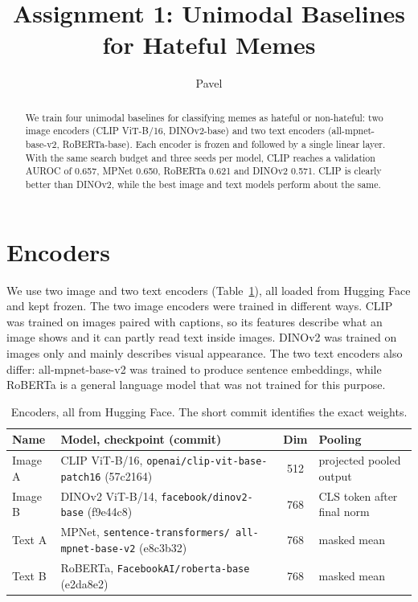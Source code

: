 \documentclass[compactaffiliation]{Interspeech}
\title{Assignment 1: Unimodal Baselines for Hateful Memes}
\author[affiliation={1}]{Pavel}{Adamov}
\affiliation{}{Johannes Kepler University Linz}{Austria}
\begin{document}
\maketitle
{}

\begin{abstract}
We train four unimodal baselines for classifying memes as hateful or non-hateful: two image
encoders (CLIP ViT-B/16, DINOv2-base) and two text encoders (all-mpnet-base-v2, RoBERTa-base). Each
encoder is frozen and followed by a single linear layer. With the same search budget and three
seeds per model, CLIP reaches a validation AUROC of 0.657, MPNet 0.650, RoBERTa 0.621 and DINOv2
0.571. CLIP is clearly better than DINOv2, while the best image and text models perform about the same.
\end{abstract}



\section{Encoders}
We use two image and two text encoders (Table~\ref{tab:encoders}), all loaded from Hugging Face and
kept frozen. The two image encoders were trained in different ways. CLIP \cite{radford2021clip}
was trained on images paired with captions, so its features describe what an image shows and it
can partly read text inside images. DINOv2 \cite{oquab2024dinov2} was trained on images only and
mainly describes visual appearance. The two text encoders also differ: all-mpnet-base-v2
\cite{reimers2019sbert, song2020mpnet} was trained to produce sentence embeddings, while RoBERTa
\cite{liu2019roberta} is a general language model that was not trained for this purpose.

\begin{table}[b]
\caption{Encoders, all from Hugging Face. The short commit identifies the exact weights.}
\label{tab:encoders}
\centering\scriptsize
\setlength{\tabcolsep}{2.5pt}
\begin{tabular}{@{}l >{\raggedright\arraybackslash}p{4.15cm} c >{\raggedright\arraybackslash}p{1.45cm}@{}}
\toprule
Name & Model, checkpoint (commit) & Dim & Pooling \\
\midrule
Image A & CLIP ViT-B/16, \texttt{openai/clip-vit-base-patch16} (57c2164) & 512 & projected pooled output \\
Image B & DINOv2 ViT-B/14, \texttt{facebook/dinov2-base} (f9e44c8) & 768 & CLS token after final norm \\
Text A & MPNet, \texttt{sentence-transformers/ all-mpnet-base-v2} (e8c3b32) & 768 & masked mean \\
Text B & RoBERTa, \texttt{FacebookAI/roberta-base} (e2da8e2) & 768 & masked mean \\
\bottomrule
\end{tabular}
\end{table}
\end{document}

